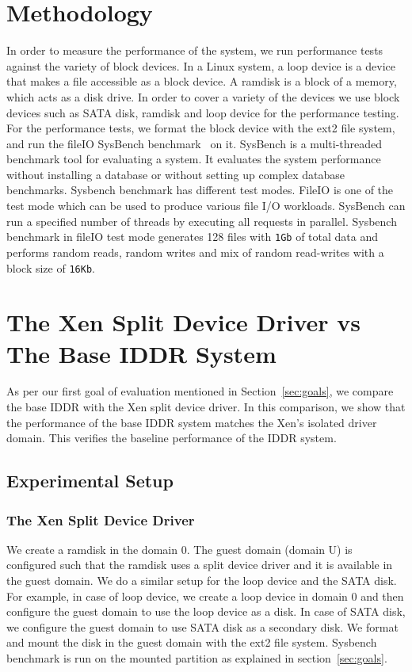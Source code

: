 \section{Methodology}
In order to measure the performance of the system, we run performance tests against the variety of block devices. In a Linux system, a loop device is a device that makes a file accessible as a block device. A ramdisk is a block of a memory, which acts as a disk drive. In order to cover a variety of the devices we use block devices such as SATA disk, ramdisk and loop device for the performance testing.
\\[3mm]
For the performance tests, we format the block device with the ext2 file system, and run the fileIO SysBench benchmark~\cite{sysbench} on it. SysBench is a multi-threaded benchmark tool for evaluating a system. It evaluates the system performance without installing a database or without setting up complex database benchmarks. Sysbench benchmark has different test modes. FileIO is one of the test mode which can be used to produce various file I/O workloads. SysBench can run a specified number of threads by executing all requests in parallel. Sysbench benchmark in fileIO test mode generates 128 files with \texttt{1Gb} of total data and performs random reads, random writes and mix of random read-writes with a block size of \texttt{16Kb}. 

\section{The Xen Split Device Driver vs The Base IDDR System}
As per our first goal of evaluation mentioned in Section~\ref{sec:goals}, we compare the base IDDR with the Xen split device driver. In this comparison, we show that the performance of the base IDDR system matches the Xen's isolated driver domain. This verifies the baseline performance of the IDDR system.

\subsection{Experimental Setup}

\subsubsection*{The Xen Split Device Driver}
We create a ramdisk in the domain 0. The guest domain (domain U) is configured such that the ramdisk uses a split device driver and it is available in the guest domain. We do a similar setup for the loop device and the SATA disk. For example, in case of loop device, we create a loop device in domain 0 and then configure the guest domain to use the loop device as a disk. In case of SATA disk, we configure the guest domain to use SATA disk as a secondary disk. We format and mount the disk in the guest domain with the ext2 file system. Sysbench benchmark is run on the mounted partition as explained in section~\ref{sec:goals}.

